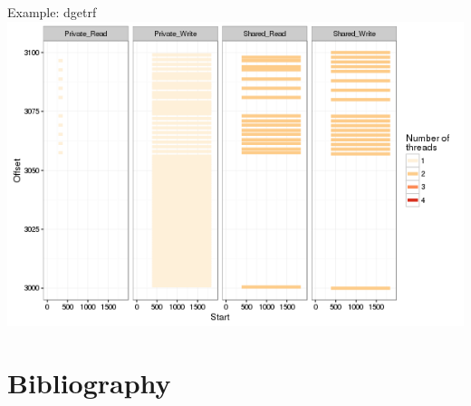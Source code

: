 \documentclass[xcolor={usenames,dvipsnames},hyperref={pdfusetitle}]{beamer}
\begin{document}
\begin{frame}{Example: dgetrf}
{{{            }{
                \includegraphics[width=\textwidth]{labbook-slides/intensity_Share_dgetrf_zoom-init1}
            }
        }
    }
    \pause
    \pause
    \pause
\end{frame}%


\section*{Bibliography}
%


\end{document}
